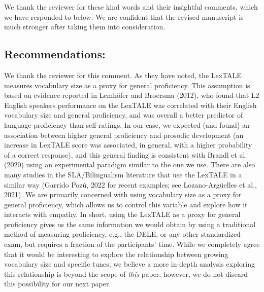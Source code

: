 \documentclass[]{article}
\newcommand{\TaskEstimationBox}[2]{%
\ifoptiondraft{\parbox{1.0\linewidth}{\hfill \hfill {\colorbox{#2}{\color{White} \textbf{#1}}}}}%
{}%
}
\def\Done {\TaskEstimationBox{Done}{Blue}}
\def\Easy {\TaskEstimationBox{Feasible}{ForestGreen}}
\begin{document}
We thank the reviewer for these kind words and their insightful comments, which we have responded to below.
We are confident that the revised manuscript is much stronger after taking them into consideration.

\Done
\Easy

\hypertarget{recommendations}{%
\subsection{Recommendations:}\label{recommendations}}


We thank the reviewer for this comment.
As they have noted, the LexTALE measures vocabulary size as a proxy for general proficiency.
This assumption is based on evidence reported in Lemhöfer and Broersma (2012), who found that L2 English speakers performance on the LexTALE was correlated with their English vocabulary size and general proficiency, and was overall a better predictor of language proficiency than self-ratings.
In our case, we expected (and found) an association between higher general proficiency and prosodic development (an increase in LexTALE score was associated, in general, with a higher probability of a correct response), and this general finding is consistent with Brandl et al. (2020) using an experimental paradigm similar to the one we use.
There are also many studies in the SLA/Bilingualism literature that use the LexTALE in a similar way (Garrido Pozú, 2022 for recent examples; see Lozano-Argüelles et al., 2021).
We are primarily concerned with using vocabulary size as a proxy for general proficiency, which allows us to control this variable and explore how it interacts with empathy.
In short, using the LexTALE as a proxy for general proficiency gives us the same information we would obtain by using a traditional method of measuring proficiency, e.g., the DELE, or any other standardized exam, but requires a fraction of the participants' time.
While we completely agree that it would be interesting to explore the relationship between growing vocabulary size and specific tunes, we believe a more in-depth analysis exploring this relationship is beyond the scope of \emph{this} paper, however, we do not discard this possibility for our next paper.
\end{document}
